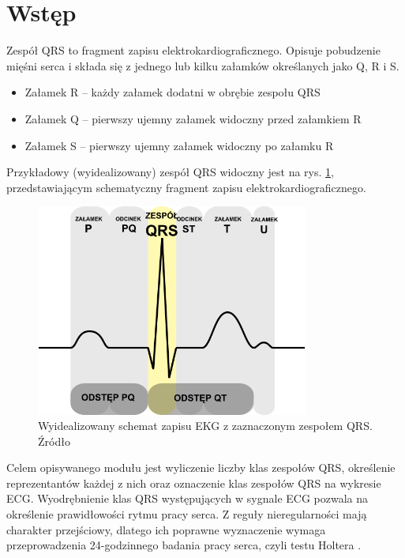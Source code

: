 \section{Wstęp}

\qquad Zespół QRS to fragment zapisu elektrokardiograficznego. Opisuje pobudzenie mięśni serca i składa się z jednego lub kilku załamków określanych jako Q, R i S.
\begin{itemize}
	\item Załamek R – każdy załamek dodatni w obrębie zespołu QRS
	\item Załamek Q – pierwszy ujemny załamek widoczny przed załamkiem R
	\item Załamek S – pierwszy ujemny załamek widoczny po załamku R
\end{itemize}
Przykładowy (wyidealizowany) zespół QRS widoczny jest na rys. \ref{fig:QRSComplex}, przedstawiającym schematyczny fragment zapisu elektrokardiograficznego.


\begin{figure}[h]
	\centering
	\includegraphics[width=0.8\textwidth]{Grafika/ZespolQRS}
	\caption{Wyidealizowany schemat zapisu EKG z zaznaczonym zespołem QRS. Źródło  \cite{QRSComplexWiki}}
	\label{fig:QRSComplex}
\end{figure}

\qquad Celem opisywanego modułu jest wyliczenie liczby klas zespołów QRS, określenie reprezentantów każdej z nich oraz oznaczenie klas zespołów QRS na wykresie ECG. Wyodrębnienie klas QRS występujących w sygnale ECG pozwala na określenie prawidłowości rytmu pracy serca. Z reguły nieregularności mają charakter przejściowy, dlatego ich poprawne wyznaczenie wymaga przeprowadzenia 24-godzinnego badania pracy serca, czyli testu Holtera \cite{RaportKoncowy}.